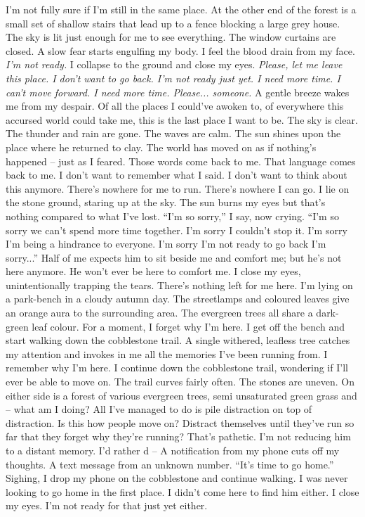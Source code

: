 \documentclass[a4paper, 12pt]{book}
\newcommand\tab[1][1cm]{\hspace*{#1}}
\begin{document}
\newline
\tab
I’m not fully sure if I’m still in the same place.  At the other end of the forest is a small set of shallow stairs that lead up to a fence blocking a large grey house. The sky is lit just enough for me to see everything. The window curtains are closed. A slow fear starts engulfing my body. I feel the blood drain from my face. \textit{I’m not ready.} I collapse to the ground and close my eyes. \textit{Please, let me leave this place. I don’t want to go back. I’m not ready just yet. I need more time. I can’t move forward. I need more time. Please... someone.}
\newline
\tab
A gentle breeze wakes me from my despair. Of all the places I could’ve awoken to, of everywhere this accursed world could take me, this is the last place I want to be. The sky is clear. The thunder and rain are gone. The waves are calm. The sun shines upon the place where he returned to clay. The world has moved on as if nothing’s happened -- just as I feared. Those words come back to me. That language comes back to me. I don’t want to remember what I said. I don’t want to think about this anymore. There’s nowhere for me to run. There’s nowhere I can go. I lie on the stone ground, staring up at the sky. The sun burns my eyes but that’s nothing compared to what I’ve lost. ``I’m so sorry,'' I say, now crying. ``I’m so sorry we can’t spend more time together. I’m sorry I couldn’t stop it. I’m sorry I’m being a hindrance to everyone. I’m sorry I’m not ready to go back I’m sorry...'' Half of me expects him to sit beside me and comfort me; but he’s not here anymore. He won’t ever be here to comfort me. I close my eyes, unintentionally trapping the tears. There’s nothing left for me here.
\newline
\tab
I’m lying on a park-bench in a cloudy autumn day. The streetlamps and coloured leaves give an orange aura to the surrounding area. The evergreen trees all share a dark-green leaf colour. For a moment, I forget why I’m here. I get off the bench and start walking down the cobblestone trail. A single withered, leafless tree catches my attention and invokes in me all the memories I’ve been running from. I remember why I’m here. I continue down the cobblestone trail, wondering if I’ll ever be able to move on. The trail curves fairly often. The stones are uneven. On either side is a forest of various evergreen trees, semi unsaturated green grass and -- what am I doing? All I’ve managed to do is pile distraction on top of distraction. Is this how people move on? Distract themselves until they’ve run so far that they forget why they’re running? That’s pathetic. I’m not reducing him to a distant memory. I’d rather d -- A notification from my phone cuts off my thoughts. A text message from an unknown number. ``It’s time to go home.'' Sighing, I drop my phone on the cobblestone and continue walking. I was never looking to go home in the first place. I didn’t come here to find him either. I close my eyes. I’m not ready for that just yet either.
\end{document}
